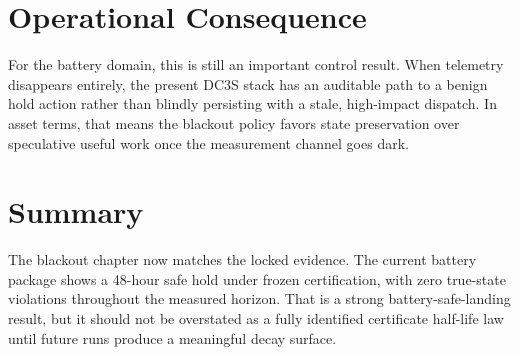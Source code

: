\section{Operational Consequence}

For the battery domain, this is still an important control result.  When
telemetry disappears entirely, the present DC3S stack has an auditable path
to a benign hold action rather than blindly persisting with a stale,
high-impact dispatch.  In asset terms, that means the blackout policy favors
state preservation over speculative useful work once the measurement channel
goes dark.

\section{Summary}

The blackout chapter now matches the locked evidence.  The current battery
package shows a 48-hour safe hold under frozen certification, with zero
true-state violations throughout the measured horizon.  That is a strong
battery-safe-landing result, but it should not be overstated as a fully
identified certificate half-life law until future runs produce a meaningful
decay surface.
